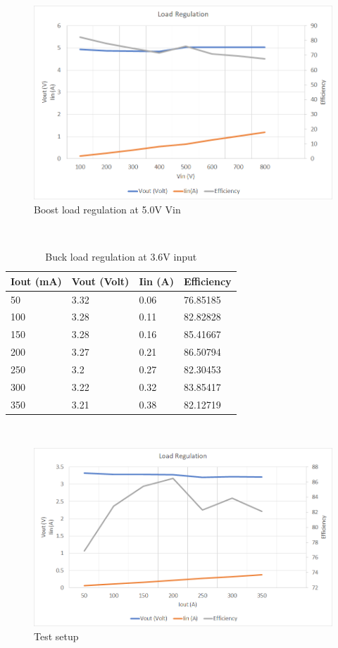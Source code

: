 \begin{figure}[H]
	\centering
	\includegraphics[width=\columnwidth]{IMGS/Boost load regulation at 5V Vin.png}
	\caption{Boost load regulation at 5.0V Vin}
	\label{fig:arch}
\end{figure}
\\
\begin{table}[H]
\centering
\begin{tabular}{|l|l|l|l|}
\hline
Iout (mA) & Vout (Volt) & Iin (A) & Efficiency \\ \hline
50        & 3.32        & 0.06    & 76.85185   \\ \hline
100       & 3.28        & 0.11    & 82.82828   \\ \hline
150       & 3.28        & 0.16    & 85.41667   \\ \hline
200       & 3.27        & 0.21    & 86.50794   \\ \hline
250       & 3.2         & 0.27    & 82.30453   \\ \hline
300       & 3.22        & 0.32    & 83.85417   \\ \hline
350       & 3.21        & 0.38    & 82.12719   \\ \hline
\end{tabular}
\caption{Buck load regulation at 3.6V input}
\label{table:4}
\end{table}
\\
\begin{figure}[H]
	\centering
	\includegraphics[width=\columnwidth]{IMGS/Buck load regulation at 3.6V input.png}
	\caption{Test setup}
	\label{fig:arch}
\end{figure}
